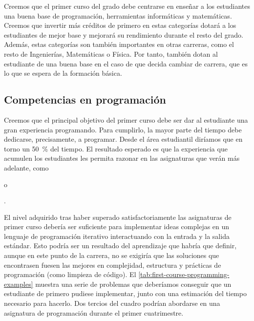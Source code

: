 Creemos que el primer curso del grado debe centrarse en
enseñar a los estudiantes una buena base de
programación,
herramientas informáticas y
matemáticas.
Creemos que invertir más créditos de primero en estas categorías
dotará a los estudiantes de mejor base y
mejorará su rendimiento durante el resto del grado.
Además, estas categorías son también importantes en otras carreras,
como el resto de Ingenierías, Matemáticas o Física.
Por tanto, también dotan al estudiante de una buena base
en el caso de que decida cambiar de carrera,
que es lo que se espera de la formación básica.

\subsection{Competencias en programación}

Creemos que el principal objetivo del primer curso debe ser
dar al estudiante una gran experiencia programando.
Para cumplirlo, la mayor parte del tiempo debe dedicarse,
precisamente, a programar.
Desde el área estudiantil diríamos que
en torno un \SI{50}{\percent} del tiempo.
El resultado esperado es que la experiencia que acumulen los estudiantes
les permita razonar en las asignaturas que verán más adelante,
como \subject{Programación Orientada a Objetos} o
\subject{Algoritmos y Estructuras de Datos}\footnotemark.


El nivel adquirido tras
haber superado satisfactoriamente las asignaturas de primer curso
debería ser suficiente para implementar ideas complejas en
un lenguaje de programación iterativo
interactuando con la entrada y la salida estándar.
Esto podría ser un resultado del aprendizaje que habría que definir,
aunque en este punto de la carrera,
no se exigiría que las soluciones que encontrasen fuesen las mejores en
complejidad, estructura y prácticas de programación
(como limpieza de código).
El \cref{tab:first-course-programming-examples}
muestra una serie de problemas que deberíamos conseguir que
un estudiante de primero pudiese implementar,
junto con una estimación del tiempo necesario para hacerlo.
Dos tercios del cuadro podrían abordarse en
una asignatura de programación durante el primer cuatrimestre.

